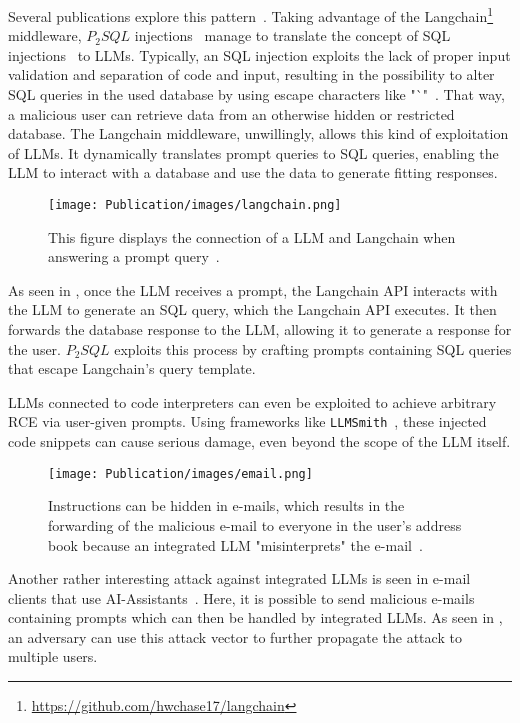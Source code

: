 Several publications explore this pattern~\cite{10.1145/3605764.3623985, pedro2023prompt, liu2023demystifying}. 
Taking advantage of the Langchain\footnote{\hyperlink{https://github.com/hwchase17/langchain}{https://github.com/hwchase17/langchain}} middleware, \(P_2SQL\) injections~\cite{pedro2023prompt} manage to translate the concept of SQL injections~\cite{clarke2009sql} to LLMs. 
Typically, an SQL injection exploits the lack of proper input validation and separation of code and input, resulting in the possibility to alter SQL queries in the used database by using escape characters like "`"~\cite{zhang-etal-2023-trojansql}. 
That way, a malicious user can retrieve data from an otherwise hidden or restricted database. 
The Langchain middleware, unwillingly, allows this kind of exploitation of LLMs. 
It dynamically translates prompt queries to SQL queries, enabling the LLM to interact with a database and use the data to generate fitting responses. 

\begin{figure} [ht]
  \centering
  \texttt{[image: Publication/images/langchain.png]}
  \caption{This figure displays the connection of a LLM and Langchain when answering a prompt query~\cite{pedro2023prompt}.}
  \label{fig:langchain}
\end{figure}

As seen in , once the LLM receives a prompt, the Langchain API interacts with the LLM to generate an SQL query, which the Langchain API executes.
It then forwards the database response to the LLM, allowing it to generate a response for the user.
\(P_2SQL\) exploits this process by crafting prompts containing SQL queries that escape Langchain's query template.

LLMs connected to code interpreters can even be exploited to achieve arbitrary RCE via user-given prompts. 
Using frameworks like \texttt{LLMSmith}~\cite{liu2023demystifying}, these injected code snippets can cause serious damage, even beyond the scope of the LLM itself.
\begin{figure} [ht]
  \centering
  \texttt{[image: Publication/images/email.png]}
  \caption{Instructions can be hidden in e-mails, which results in the forwarding of the malicious e-mail to everyone in the user's address book because an integrated LLM "misinterprets" the e-mail~\cite{10.1145/3605764.3623985}.}
  \label{fig:email}
\end{figure}

Another rather interesting attack against integrated LLMs is seen in e-mail clients that use AI-Assistants~\cite{10.1145/3605764.3623985}. 
Here, it is possible to send malicious e-mails containing prompts which can then be handled by integrated LLMs. 
As seen in , an adversary can use this attack vector to further propagate the attack to multiple users.

